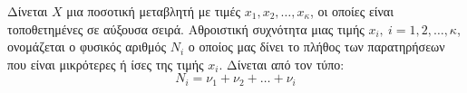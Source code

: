 Δίνεται $ X $ μια ποσοτική μεταβλητή με τιμές $ x_1,x_2,\ldots,x_{\kappa} $, οι οποίες είναι τοποθετημένες σε αύξουσα σειρά. Αθροιστική συχνότητα μιας τιμής $ x_i,\ i=1,2,\ldots,\kappa $, ονομάζεται ο φυσικός αριθμός $ N_i $ ο οποίος μας δίνει το πλήθος των παρατηρήσεων που είναι μικρότερες ή ίσες της τιμής $ x_i $. Δίνεται από τον τύπο:
\[ N_i=\nu_1+\nu_2+\ldots+\nu_i \]
